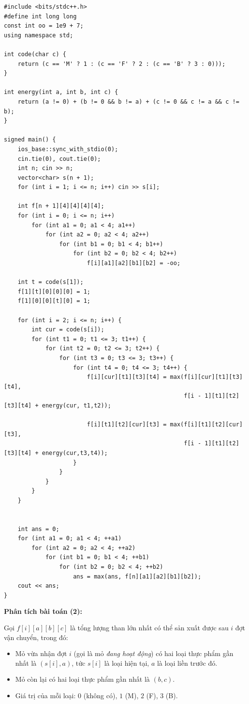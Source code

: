 \begin{lstlisting}[title=\centering\textbf{Cài đặt}]
#include <bits/stdc++.h>
#define int long long
const int oo = 1e9 + 7;
using namespace std;

int code(char c) {
    return (c == 'M' ? 1 : (c == 'F' ? 2 : (c == 'B' ? 3 : 0)));
}

int energy(int a, int b, int c) {
    return (a != 0) + (b != 0 && b != a) + (c != 0 && c != a && c != b);
}

signed main() {
    ios_base::sync_with_stdio(0); 
    cin.tie(0), cout.tie(0);
    int n; cin >> n;
    vector<char> s(n + 1);
    for (int i = 1; i <= n; i++) cin >> s[i];

    int f[n + 1][4][4][4][4];
    for (int i = 0; i <= n; i++)
        for (int a1 = 0; a1 < 4; a1++)
            for (int a2 = 0; a2 < 4; a2++)
                for (int b1 = 0; b1 < 4; b1++)
                    for (int b2 = 0; b2 < 4; b2++)
                        f[i][a1][a2][b1][b2] = -oo;

    int t = code(s[1]);
    f[1][t][0][0][0] = 1;
    f[1][0][0][t][0] = 1;

    for (int i = 2; i <= n; i++) {
        int cur = code(s[i]);
        for (int t1 = 0; t1 <= 3; t1++) {
            for (int t2 = 0; t2 <= 3; t2++) {
                for (int t3 = 0; t3 <= 3; t3++) {
                    for (int t4 = 0; t4 <= 3; t4++) {
                        f[i][cur][t1][t3][t4] = max(f[i][cur][t1][t3][t4],
                                                    f[i - 1][t1][t2][t3][t4] + energy(cur, t1,t2));
                        
                        f[i][t1][t2][cur][t3] = max(f[i][t1][t2][cur][t3],
                                                    f[i - 1][t1][t2][t3][t4] + energy(cur,t3,t4));
                    }
                }
            }
        }
    }


    int ans = 0;
    for (int a1 = 0; a1 < 4; ++a1)
        for (int a2 = 0; a2 < 4; ++a2)
            for (int b1 = 0; b1 < 4; ++b1)
                for (int b2 = 0; b2 < 4; ++b2)
                    ans = max(ans, f[n][a1][a2][b1][b2]);
    cout << ans;
}
\end{lstlisting}

\textbf{Phân tích bài toán (2):}

Gọi $f[i][a][b][c]$ là tổng lượng than lớn nhất có thể sản xuất được sau $i$ đợt vận chuyển, trong đó:
\begin{itemize}
    \item Mỏ vừa nhận đợt $i$ (gọi là mỏ \textit{đang hoạt động}) có hai loại thực phẩm gần nhất là $(s[i], a)$, tức $s[i]$ là loại hiện tại, $a$ là loại liền trước đó.
    \item Mỏ còn lại có hai loại thực phẩm gần nhất là $(b, c)$.
    \item Giá trị của mỗi loại: $0$ (không có), $1$ (M), $2$ (F), $3$ (B).
\end{itemize}


